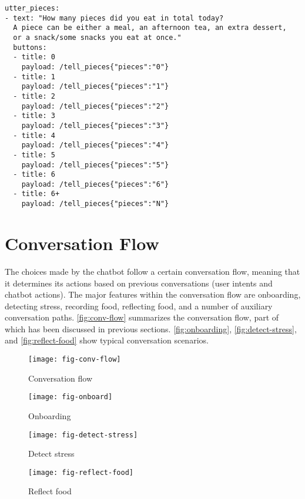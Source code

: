 \begin{lstlisting}
utter_pieces:
- text: "How many pieces did you eat in total today?
  A piece can be either a meal, an afternoon tea, an extra dessert,
  or a snack/some snacks you eat at once."
  buttons:
  - title: 0
    payload: /tell_pieces{"pieces":"0"}
  - title: 1
    payload: /tell_pieces{"pieces":"1"}
  - title: 2
    payload: /tell_pieces{"pieces":"2"}
  - title: 3
    payload: /tell_pieces{"pieces":"3"}
  - title: 4
    payload: /tell_pieces{"pieces":"4"}
  - title: 5
    payload: /tell_pieces{"pieces":"5"}
  - title: 6
    payload: /tell_pieces{"pieces":"6"}
  - title: 6+
    payload: /tell_pieces{"pieces":"N"}
\end{lstlisting}

\section{Conversation Flow} \label{flow}
The choices made by the chatbot follow a certain conversation flow, meaning that it determines its actions based on previous conversations (user intents and chatbot actions). The major features within the conversation flow are onboarding, detecting stress, recording food, reflecting food, and a number of auxiliary conversation paths. \autoref{fig:conv-flow} summarizes the conversation flow, part of which has been discussed in previous sections. \autoref{fig:onboarding}, \autoref{fig:detect-stress}, and \autoref{fig:reflect-food} show typical conversation scenarios.

\begin{figure}[ht]
  \centering
  \texttt{[image: fig-conv-flow]}
  \caption{Conversation flow}
  \label{fig:conv-flow}
\end{figure}

\begin{figure}[ht]
  \centering
  \texttt{[image: fig-onboard]}
  \caption{Onboarding}
  \label{fig:onboarding}
\end{figure}

\begin{figure}[ht]
  \centering
  \texttt{[image: fig-detect-stress]}
  \caption{Detect stress}
  \label{fig:detect-stress}
\end{figure}

\begin{figure}[ht]
  \centering
  \texttt{[image: fig-reflect-food]}
  \caption{Reflect food}
  \label{fig:reflect-food}
\end{figure}

